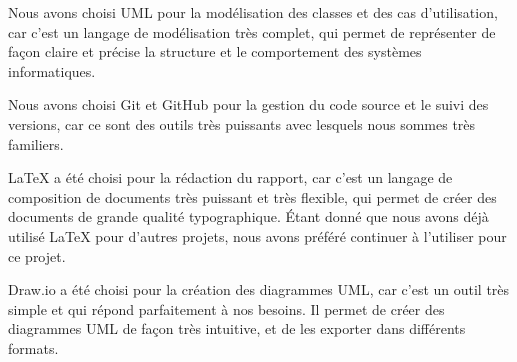 Nous avons choisi UML pour la modélisation des classes et des cas d'utilisation,
car c'est un langage de modélisation très complet, qui permet de représenter de
façon claire et précise la structure et le comportement des systèmes informatiques.

Nous avons choisi Git et GitHub pour la gestion du code source et le suivi des
versions, car ce sont des outils très puissants avec lesquels nous sommes très
familiers.

LaTeX a été choisi pour la rédaction du rapport, car c'est un langage de
composition de documents très puissant et très flexible, qui permet de créer des
documents de grande qualité typographique.
Étant donné que nous avons déjà utilisé LaTeX pour d'autres projets, nous avons
préféré continuer à l'utiliser pour ce projet.

Draw.io a été choisi pour la création des diagrammes UML, car c'est un outil très
simple et qui répond parfaitement à nos besoins. Il permet de créer des diagrammes
UML de façon très intuitive, et de les exporter dans différents formats.

